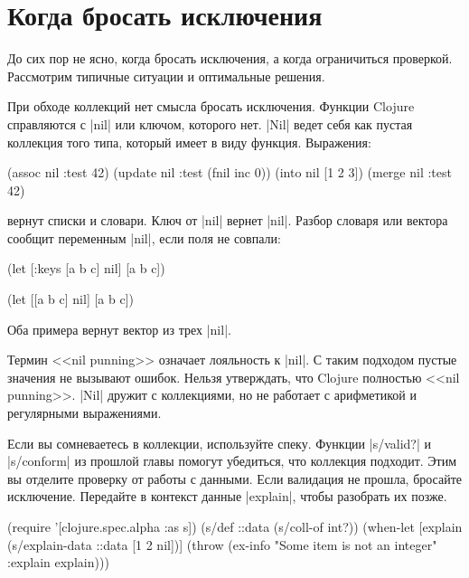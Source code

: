 \section{Когда бросать исключения}

До сих пор не ясно, когда бросать исключения, а когда ограничиться
проверкой. Рассмотрим типичные ситуации и оптимальные решения.

При обходе коллекций нет смысла бросать исключения. Функции Clojure справляются
с \spverb|nil| или ключом, которого нет. \spverb|Nil| ведет себя как пустая
коллекция того типа, который имеет в виду функция. Выражения:

\begin{english}
  \begin{clojure}
(assoc nil :test 42)
(update nil :test (fnil inc 0))
(into nil [1 2 3])
(merge nil {:test 42})
  \end{clojure}
\end{english}

\noindent
вернут списки и словари. Ключ от \spverb|nil| вернет \spverb|nil|. Разбор
словаря или вектора сообщит переменным \spverb|nil|, если поля не совпали:

\begin{english}
  \begin{clojure}
(let [{:keys [a b c]} nil]
  [a b c])

(let [[a b c] nil]
  [a b c])
  \end{clojure}
\end{english}

\noindent
Оба примера вернут вектор из трех \spverb|nil|.

Термин <<nil punning>> означает лояльность к \spverb|nil|. С таким подходом
пустые значения не вызывают ошибок. Нельзя утверждать, что Clojure полностью
<<nil punning>>. \spverb|Nil| дружит с коллекциями, но не работает с арифметикой
и регулярными выражениями.

Если вы сомневаетесь в коллекции, используйте спеку. Функции \spverb|s/valid?| и
\spverb|s/conform| из прошлой главы  помогут убедиться, что
коллекция подходит. Этим вы отделите проверку от работы с данными. Если
валидация не прошла, бросайте исключение. Передайте в контекст данные
\spverb|explain|, чтобы разобрать их позже.

\begin{english}
  \begin{clojure}
(require '[clojure.spec.alpha :as s])
(s/def ::data (s/coll-of int?))
(when-let [explain (s/explain-data ::data [1 2 nil])]
  (throw (ex-info "Some item is not an integer" {:explain explain})))
  \end{clojure}
\end{english}

